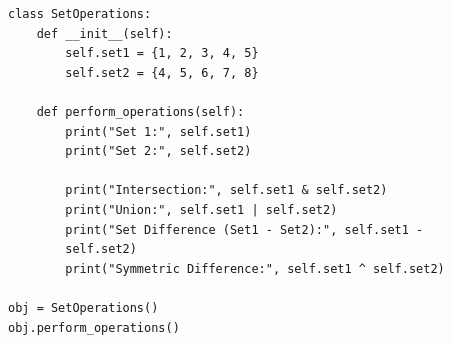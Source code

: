 \begin{verbatim}
class SetOperations:
    def __init__(self):
        self.set1 = {1, 2, 3, 4, 5}
        self.set2 = {4, 5, 6, 7, 8}

    def perform_operations(self):
        print("Set 1:", self.set1)
        print("Set 2:", self.set2)

        print("Intersection:", self.set1 & self.set2)
        print("Union:", self.set1 | self.set2)
        print("Set Difference (Set1 - Set2):", self.set1 - 
        self.set2)
        print("Symmetric Difference:", self.set1 ^ self.set2)

obj = SetOperations()
obj.perform_operations()
\end{verbatim}